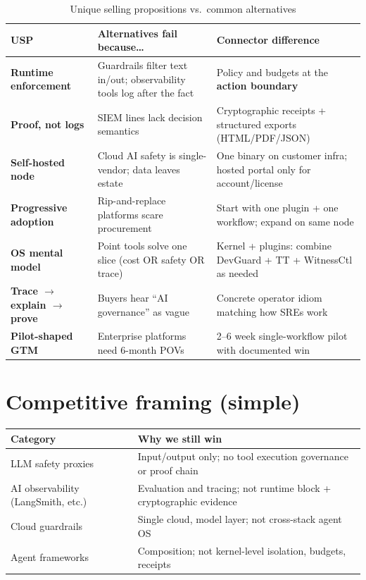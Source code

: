 \begin{table}[H]
\centering
\small
\renewcommand{\arraystretch}{1.35}
\begin{tabularx}{\textwidth}{@{}>{\bfseries}p{} p{} X@{}}
\toprule
USP & Alternatives fail because\ldots & Connector difference \\
\midrule
Runtime enforcement & Guardrails filter text in/out; observability tools log after the fact & Policy and budgets at the \textbf{action boundary} \\
Proof, not logs & SIEM lines lack decision semantics & Cryptographic receipts + structured exports (HTML/PDF/JSON) \\
Self-hosted node & Cloud AI safety is single-vendor; data leaves estate & One binary on customer infra; hosted portal only for account/license \\
Progressive adoption & Rip-and-replace platforms scare procurement & Start with one plugin + one workflow; expand on same node \\
OS mental model & Point tools solve one slice (cost OR safety OR trace) & Kernel + plugins: combine DevGuard + TT + WitnessCtl as needed \\
Trace $\rightarrow$ explain $\rightarrow$ prove & Buyers hear ``AI governance'' as vague & Concrete operator idiom matching how SREs work \\
Pilot-shaped GTM & Enterprise platforms need 6-month POVs & 2--6 week single-workflow pilot with documented win \\
\bottomrule
\end{tabularx}
\caption{Unique selling propositions vs.\ common alternatives}
\end{table}

\section{Competitive framing (simple)}

\begin{center}
\renewcommand{\arraystretch}{1.25}
\small
\begin{tabularx}{0.95\textwidth}{@{}l X@{}}
\toprule
\textbf{Category} & \textbf{Why we still win} \\
\midrule
LLM safety proxies & Input/output only; no tool execution governance or proof chain \\
AI observability (LangSmith, etc.) & Evaluation and tracing; not runtime block + cryptographic evidence \\
Cloud guardrails & Single cloud, model layer; not cross-stack agent OS \\
Agent frameworks & Composition; not kernel-level isolation, budgets, receipts \\
\bottomrule
\end{tabularx}
\end{center}

